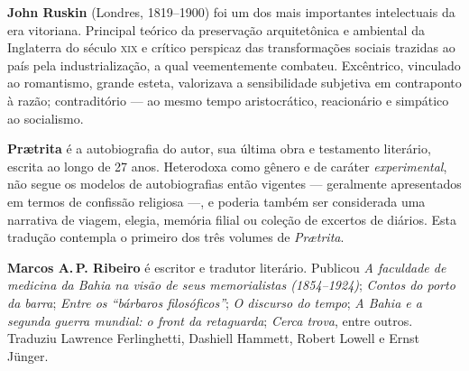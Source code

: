 \textbf{John Ruskin} (Londres, 1819--1900) foi um dos mais importantes intelectuais da era vitoriana. Principal teórico da preservação arquitetônica e ambiental da Inglaterra do século \textsc{xix} e crítico perspicaz das transformações sociais trazidas ao país pela industrialização, a qual veementemente combateu. Excêntrico, vinculado ao romantismo, grande esteta, valorizava a sensibilidade subjetiva em contraponto à razão; contraditório --- ao mesmo tempo aristocrático, reacionário e simpático ao socialismo.

\textbf{Pr\ae trita} é a autobiografia do autor, sua última obra e testamento literário, escrita ao longo de 27 anos. Heterodoxa como gênero e de caráter \textit{experimental}, não segue os modelos de autobiografias então vigentes --- geralmente apresentados em termos de confissão religiosa ---, e poderia também ser considerada uma narrativa de viagem, elegia, memória filial ou coleção de excertos de diários. Esta tradução contempla o primeiro dos três volumes de \textit{Pr\ae trita}.

\textbf{Marcos A.\,P. Ribeiro} é escritor e tradutor literário. Publicou \textit{A faculdade de medicina da Bahia na visão de seus memorialistas (1854--1924)}; \textit{Contos do porto da barra}; \textit{Entre os ``bárbaros filosóficos''}; \textit{O discurso do tempo}; \textit{A Bahia e a segunda guerra mundial: o front da retaguarda}; \textit{Cerca trova}, entre outros. Traduziu Lawrence Ferlinghetti, Dashiell Hammett, Robert Lowell e Ernst Jünger.






